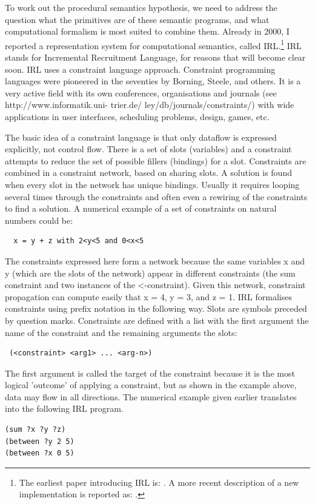 To work out the procedural semantics hypothesis, we need to address the question what the primitives are of 
these semantic programs, and what computational formalism is most suited to combine them. Already in 2000, I reported
a representation system for computational semantics, called IRL.\footnote{
The earliest paper introducing IRL is: \cite{Steels:2000}. 
A more recent description of a new implementation is reported as: \cite{Spranger:2012}.}
IRL stands for Incremental Recruitment Language, for reasons that will become clear soon. 
IRL uses a constraint language approach. Constraint programming languages were pioneered in the  
seventies by Borning, Steele, and others. It is a very active field with its own conferences, 
organisations and journals (see http://www.informatik.uni- trier.de/ ley/db/journals/constraints/) 
with wide applications in user interfaces, scheduling problems, design, games, etc. 

The basic idea of a constraint language is that only dataflow is expressed explicitly, not control flow. 
There is a set of slots (variables) and a constraint attempts to reduce the set of possible 
fillers (bindings) for a slot. Constraints are combined in 
a constraint network, based on sharing slots. A solution is found when every slot in the network has unique bindings. 
Usually it requires looping several times through the constraints and often even a rewiring of the constraints to 
find a solution. A numerical example of a set of constraints on natural numbers could be:
\begin{verbatim}
  x = y + z with 2<y<5 and 0<x<5
\end{verbatim}
The constraints expressed here form a network because the same variables x and y (which are the slots of the 
network) appear in different constraints (the sum constraint and two instances of the <-constraint). 
Given this network, constraint propagation can compute easily that x = 4, y = 3, and z = 1. 
\enlargethispage{2\baselineskip}
IRL formalises constraints using prefix notation in the following way. Slots are symbols preceded 
by question marks. Constraints are defined with a list with the first argument the name of the constraint and 
the remaining arguments the slots: 
\begin{verbatim}
 (<constraint> <arg1> ... <arg-n>)
\end{verbatim}
The first argument is called the target of the constraint because it is the most logical 'outcome' 
of applying a constraint, but as shown in the example above, data may flow in all directions. The numerical 
example given earlier translates into the following IRL program. 
\begin{verbatim}
(sum ?x ?y ?z)
(between ?y 2 5)
(between ?x 0 5)
\end{verbatim}

